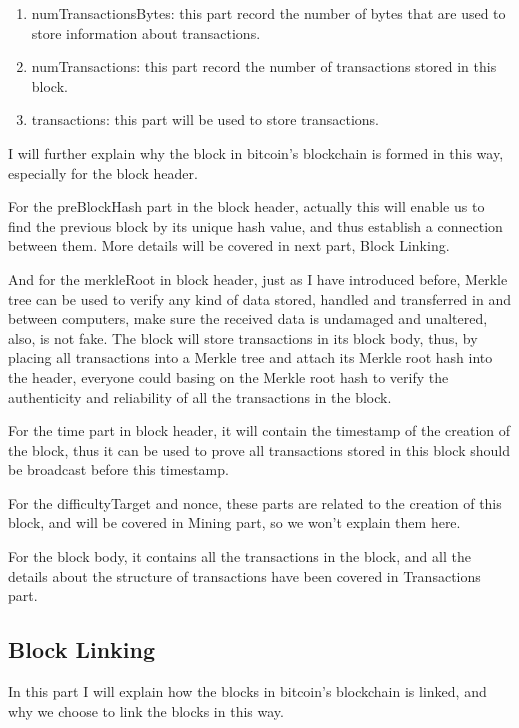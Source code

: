 \documentclass[12pt,a4paper]{article}
\begin{document}
\begin{enumerate}
    \item 
    numTransactionsBytes: this part record the number of bytes that are used to store information about transactions.
    \item
    numTransactions: this part record the number of transactions stored in this block.
    \item
    transactions: this part will be used to store transactions.
\end{enumerate}

I will further explain why the block in bitcoin's blockchain is formed in this way, especially for the block header.

For the preBlockHash part in the block header, actually this will enable us to find the previous block by its unique hash value, and thus establish a connection between them. More details will be covered in next part, Block Linking.

And for the merkleRoot in block header, just as I have introduced before, Merkle tree can be used to verify any kind of data stored, handled and transferred in and between computers, make sure the received data is undamaged and unaltered, also, is not fake. The block will store transactions in its block body, thus, by placing all transactions into a Merkle tree and attach its Merkle root hash into the header, everyone could basing on the Merkle root hash to verify the authenticity and reliability of all the transactions in the block.

For the time part in block header, it will contain the timestamp of the creation of the block, thus it can be used to prove all transactions stored in this block should be broadcast before this timestamp.

For the difficultyTarget and nonce, these parts are related to the creation of this block, and will be covered in Mining part, so we won't explain them here.

For the block body, it contains all the transactions in the block, and all the details about the structure of transactions have been covered in Transactions part.

\subsection{Block Linking}

In this part I will explain how the blocks in bitcoin's blockchain is linked, and why we choose to link the blocks in this way.
\end{document}
